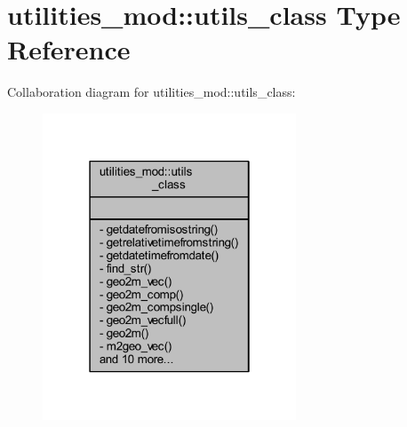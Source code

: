 \hypertarget{structutilities__mod_1_1utils__class}{}\section{utilities\+\_\+mod\+:\+:utils\+\_\+class Type Reference}
\label{structutilities__mod_1_1utils__class}


Collaboration diagram for utilities\+\_\+mod\+:\+:utils\+\_\+class\+:\nopagebreak
\begin{figure}[H]
\begin{center}
\leavevmode
\includegraphics[width=214pt]{structutilities__mod_1_1utils__class__coll__graph}
\end{center}
\end{figure}

